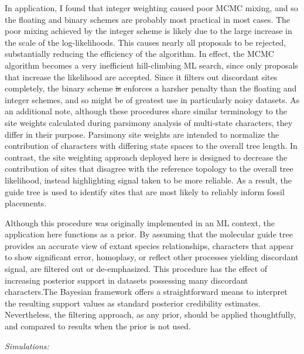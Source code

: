 \documentclass[12pt]{article}
\providecommand{\DIFdel}[1]{{\protect\color{red}\sout{#1}}}                      %
\providecommand{\DIFdelbegin}{} %
\providecommand{\DIFdelend}{} %
\newcommand{\DIFscaledelfig}{0.5}
\newlength{\DIFdelgraphicswidth} %
\newlength{\DIFdelgraphicsheight} %
\newcommand{\DIFdelincludegraphics}[2][]{%
\sbox{\DIFdelgraphicsbox}{\DIFOincludegraphics[#1]{#2}}%
\settoboxwidth{\DIFdelgraphicswidth}{\DIFdelgraphicsbox} %
\settoboxtotalheight{\DIFdelgraphicsheight}{\DIFdelgraphicsbox} %
\scalebox{\DIFscaledelfig}{%
\parbox[b]{\DIFdelgraphicswidth}{\usebox{\DIFdelgraphicsbox}\\[-\baselineskip] \rule{\DIFdelgraphicswidth}{0em}}\llap{\resizebox{\DIFdelgraphicswidth}{\DIFdelgraphicsheight}{%
\setlength{\unitlength}{\DIFdelgraphicswidth}%
\begin{picture}(1,1)%
\thicklines\linethickness{2pt} %
{\color[rgb]{1,0,0}\put(0,0){\framebox(1,1){}}}%
{\color[rgb]{1,0,0}\put(0,0){\line( 1,1){1}}}%
{\color[rgb]{1,0,0}\put(0,1){\line(1,-1){1}}}%
\end{picture}%
}\hspace*{3pt}}} %
} %
\DeclareRobustCommand{\DIFdelbegin}{\DIFOdelbegin \let\includegraphics\DIFdelincludegraphics} %
\DeclareRobustCommand{\DIFdelend}{\DIFOaddend \let\includegraphics\DIFOincludegraphics} %
\begin{document}
In application, I found that integer weighting caused poor MCMC mixing,
and so the floating and binary schemes are probably most practical in
most cases. The poor mixing achieved by the integer scheme is likely due to the large increase in the scale of the log-likelihoods. 
This causes nearly all proposals to be rejected, substantially reducing the efficiency of the algorithm. In effect,
the MCMC algorithm becomes a very inefficient hill-climbing ML search, since only proposals that increase the likelihood are accepted.
 Since it filters out discordant sites completely, the binary
scheme \DIFdelbegin \DIFdel{is }\DIFdelend enforces a harsher penalty than the floating and integer
schemes, and so might be of greatest use in particularly noisy datasets.
As an additional note, although these procedures share similar
terminology to the site weights calculated during parsimony analysis of
multi-state characters, they differ in their purpose. Parsimony site
weights are intended to normalize the contribution of characters with
differing state spaces to the overall tree length. In contrast, the site
weighting approach deployed here is designed to decrease the
contribution of sites that disagree with the reference topology to the
overall tree likelihood, instead highlighting signal taken to be
more reliable. As a result, the guide tree is used to identify sites
that are most likely to reliably inform fossil placements.

Although this procedure was originally implemented in an ML context, the application here 
functions  as a prior. By assuming that the molecular guide tree provides an accurate view of 
extant species relationships, characters that appear to show significant error, homoplasy, or 
reflect other processes yielding discordant signal, are filtered out or de-emphasized. This 
procedure has the effect of increasing posterior support in datasets possessing many discordant
characters.The Bayesian framework offers a straightforward means to interpret the resulting 
support values as standard posterior credibility estimates. Nevertheless, the filtering approach,
as any prior, should be applied thoughtfully, and compared to results when the prior is not used.

\noindent\emph{Simulations:}
\end{document}
